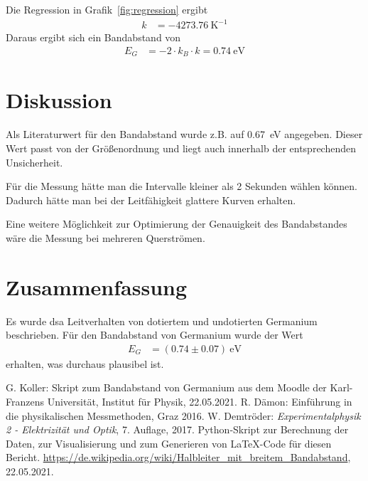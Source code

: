 \documentclass{article}
\begin{document}
Die Regression in Grafik~\ref{fig:regression} ergibt
\begin{align*}
k &= -4273.76~\text{K}^{-1}
\end{align*}
Daraus ergibt sich ein Bandabstand von
\begin{align*}
E_G &= -2\cdot k_B \cdot k = 0.74~\text{eV}
\end{align*}


\section{Diskussion}

Als Literaturwert für den Bandabstand wurde z.B. auf \cite{wikipedia} 0.67~eV angegeben. Dieser Wert passt von der Größenordnung und liegt auch innerhalb der entsprechenden Unsicherheit.

Für die Messung hätte man die Intervalle kleiner als 2 Sekunden wählen können. Dadurch hätte man bei der Leitfähigkeit glattere Kurven erhalten.

Eine weitere Möglichkeit zur Optimierung der Genauigkeit des Bandabstandes wäre die Messung bei mehreren Querströmen. 




\section{Zusammenfassung}

Es wurde dsa Leitverhalten von dotiertem und undotierten Germanium beschrieben. Für den Bandabstand von Germanium wurde der Wert
\begin{align*}
E_G &= (0.74 \pm 0.07) ~\text{eV}
\end{align*}
erhalten, was durchaus plausibel ist.


\begin{thebibliography}{9}
 G. Koller: Skript zum Bandabstand von Germanium aus dem Moodle der Karl-Franzens Universität, Institut für Physik, 22.05.2021.
  R. Dämon: Einführung in die physikalischen Messmethoden, Graz 2016.
 W. Demtröder: \emph{Experimentalphysik 2 - Elektrizität  und Optik}, 7. Auflage, 2017.
 Python-Skript zur Berechnung der Daten, zur Visualisierung und zum Generieren von \LaTeX-Code für diesen Bericht.
 \url{https://de.wikipedia.org/wiki/Halbleiter_mit_breitem_Bandabstand}, 22.05.2021.
\end{thebibliography}


\newpage 
\end{document}

